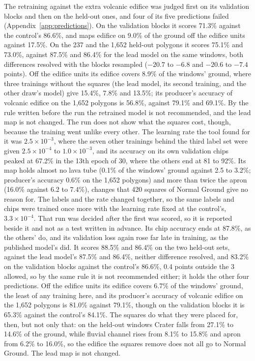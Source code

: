\documentclass[twocolumn]{aastex701}
\begin{document}
The retraining against the extra volcanic edifice was judged first on its validation blocks and then on the held-out
ones, and four of its five predictions failed (Appendix~\ref{app:predictions}). On the validation blocks it scores
71.3\% against the control's 86.6\%, and maps edifice on 9.0\% of the ground off the edifice units against 17.5\%. On
the 237 and the 1,652 held-out polygons it scores 75.1\% and 73.0\%, against 87.5\% and 86.4\% for the lead model on
the same windows, both differences resolved with the blocks resampled ($-20.7$ to $-6.8$ and $-20.6$ to $-7.4$
points). Off the edifice units its edifice covers 8.9\% of the windows' ground, where three trainings without the
squares (the lead model, its second training, and the other draw's model) give 15.4\%, 7.8\% and 13.5\%; its producer's
accuracy of volcanic edifice on the 1,652 polygons is 56.8\%, against 79.1\% and 69.1\%. By the rule written before the
run the retrained model is not recommended, and the lead map is not changed. The run does not show what the squares
cost, though, because the training went unlike every other. The learning rate the tool found for it was
$2.5\times10^{-3}$, where the seven other trainings behind the third label set were given $2.5\times10^{-4}$ to
$1.0\times10^{-3}$, and its accuracy on its own validation chips peaked at 67.2\% in the 13th epoch of 30, where the
others end at 81 to 92\%. Its map holds almost no lava tube (0.1\% of the windows' ground against 2.5 to 3.2\%; producer's
accuracy 0.6\% on the 1,652 polygons) and more than twice the apron (16.0\% against 6.2 to 7.4\%), changes that 420
squares of Normal Ground give no reason for. The labels and the rate changed together, so the same labels and chips were trained once more with the learning
rate fixed at the control's, $3.3\times10^{-4}$. That run was decided after the first was scored, so it is reported
beside it and not as a test written in advance. Its chip accuracy ends at 87.8\%, as the others' do, and its
validation loss again rose far late in training, as the published model's did. It scores 88.5\% and 86.4\% on the two
held-out sets, against the lead model's 87.5\% and 86.4\%, neither difference resolved, and 83.2\% on the validation
blocks against the control's 86.6\%, 0.4 points outside the 3 allowed, so by the same rule it is not recommended
either; it holds the other four predictions. Off the edifice units its edifice covers 6.7\% of the windows' ground,
the least of any training here, and its producer's accuracy of volcanic edifice on the 1,652 polygons is 81.0\%
against 79.1\%, though on the validation blocks it is 65.3\% against the control's 84.1\%. The squares do what they
were placed for, then, but not only that: on the held-out windows Crater falls from 27.1\% to 14.6\% of the ground,
while fluvial channel rises from 8.1\% to 15.8\% and apron from 6.2\% to 16.0\%, so the edifice the squares remove does
not all go to Normal Ground. The lead map is not changed. %
\end{document}
